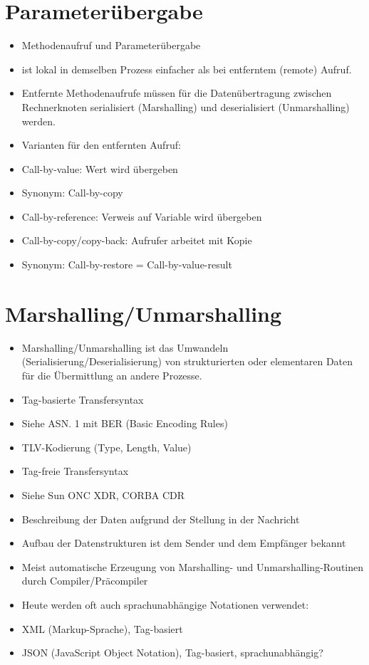 \documentclass[10pt]{article}
\begin{document}
\section*{Parameterübergabe}
\begin{itemize}
  \item Methodenaufruf und Parameterübergabe
  \item ist lokal in demselben Prozess einfacher als bei entferntem (remote) Aufruf.
  \item Entfernte Methodenaufrufe müssen für die Datenübertragung zwischen Rechnerknoten serialisiert (Marshalling) und deserialisiert (Unmarshalling) werden.
  \item Varianten für den entfernten Aufruf:
  \item Call-by-value: Wert wird übergeben
  \item Synonym: Call-by-copy
  \item Call-by-reference: Verweis auf Variable wird übergeben
  \item Call-by-copy/copy-back: Aufrufer arbeitet mit Kopie
  \item Synonym: Call-by-restore = Call-by-value-result
\end{itemize}

\section*{Marshalling/Unmarshalling}
\begin{itemize}
  \item Marshalling/Unmarshalling ist das Umwandeln (Serialisierung/Deserialisierung) von strukturierten oder elementaren Daten für die Übermittlung an andere Prozesse.
  \item Tag-basierte Transfersyntax
  \item Siehe ASN. 1 mit BER (Basic Encoding Rules)
  \item TLV-Kodierung (Type, Length, Value)
  \item Tag-freie Transfersyntax
  \item Siehe Sun ONC XDR, CORBA CDR
  \item Beschreibung der Daten aufgrund der Stellung in der Nachricht
  \item Aufbau der Datenstrukturen ist dem Sender und dem Empfänger bekannt
  \item Meist automatische Erzeugung von Marshalling- und Unmarshalling-Routinen durch Compiler/Präcompiler
  \item Heute werden oft auch sprachunabhängige Notationen verwendet:
  \item XML (Markup-Sprache), Tag-basiert
  \item JSON (JavaScript Object Notation), Tag-basiert, sprachunabhängig?
\end{itemize}
\end{document}
